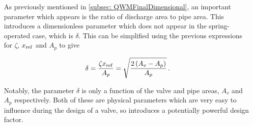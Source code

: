 As previously mentioned in \cref{subsec: QWMFinalDimensional}, an important parameter which appears is the ratio of discharge area to pipe area. This introduces a dimensionless parameter which does not appear in the spring-operated case, which is $\delta$. This can be simplified using the previous expressions for $\zeta$, $x_{\rm{ref}}$ and $A_p$ to give

\begin{equation*}
    \delta = \frac{\zeta x_{\rm{ref}}}{A_p} = \sqrt{\frac{2 \left( A_v - A_p \right)}{A_p}} \, .
\end{equation*}

Notably, the parameter $\delta$ is only a function of the valve and pipe areas, $A_v$ and $A_p$ respectively. Both of these are physical parameters which are very easy to influence during the design of a valve, so introduces a potentially powerful design factor.


% 


